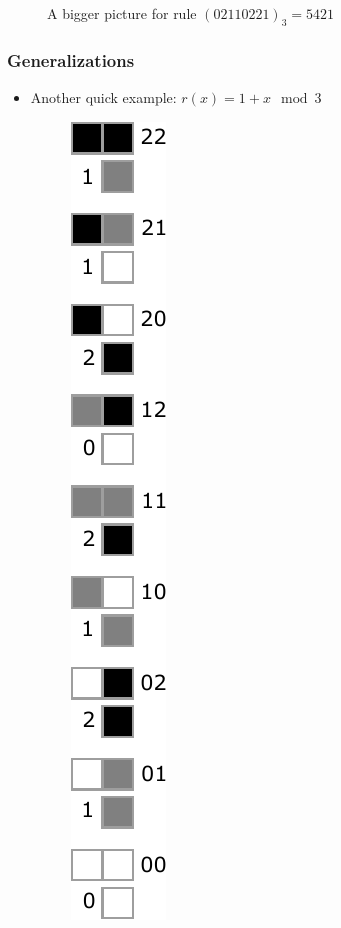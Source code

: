 \documentclass{beamer}
\begin{document}
\begin{frame}
\begin{figure}
        \caption{A bigger picture for rule $(02110221)_3 = 5421$}
    \end{figure}
\end{frame}

\begin{frame}
    \frametitle{Generalizations}
    \begin{itemize}
        \item Another quick example: $r(x) = 1 + x \mod 3$
        \begin{figure}
            \centering 
            \includegraphics[scale=0.5]{mod3ployrule.pdf}

\end{figure}
\end{itemize}
\end{frame}
\end{document}
